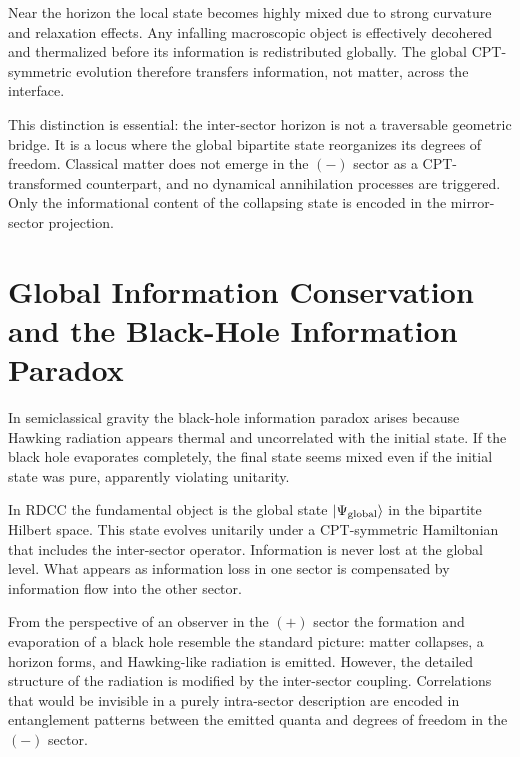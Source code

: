 \documentclass[11pt,a4paper]{article}
\begin{document}
Near the horizon the local state becomes highly mixed due to strong curvature and
relaxation effects. Any infalling macroscopic object is effectively decohered and
thermalized before its information is redistributed globally. The global CPT-symmetric
evolution therefore transfers information, not matter, across the interface.

This distinction is essential: the inter-sector horizon is not a traversable geometric
bridge. It is a locus where the global bipartite state reorganizes its degrees of freedom.
Classical matter does not emerge in the $(-)$ sector as a CPT-transformed counterpart,
and no dynamical annihilation processes are triggered. Only the informational content of
the collapsing state is encoded in the mirror-sector projection.


\section{Global Information Conservation and the Black-Hole Information Paradox}

In semiclassical gravity the black-hole information paradox arises because Hawking
radiation appears thermal and uncorrelated with the initial state. If the black hole
evaporates completely, the final state seems mixed even if the initial state was pure,
apparently violating unitarity.

In RDCC the fundamental object is the global state $\ket{\Psi_{\mathrm{global}}}$ in the
bipartite Hilbert space. This state evolves unitarily under a CPT-symmetric Hamiltonian
that includes the inter-sector operator. Information is never lost at the global level.
What appears as information loss in one sector is compensated by information flow into
the other sector.

From the perspective of an observer in the $(+)$ sector the formation and evaporation of
a black hole resemble the standard picture: matter collapses, a horizon forms, and
Hawking-like radiation is emitted. However, the detailed structure of the radiation is
modified by the inter-sector coupling. Correlations that would be invisible in a purely
intra-sector description are encoded in entanglement patterns between the emitted
quanta and degrees of freedom in the $(-)$ sector.
\end{document}
